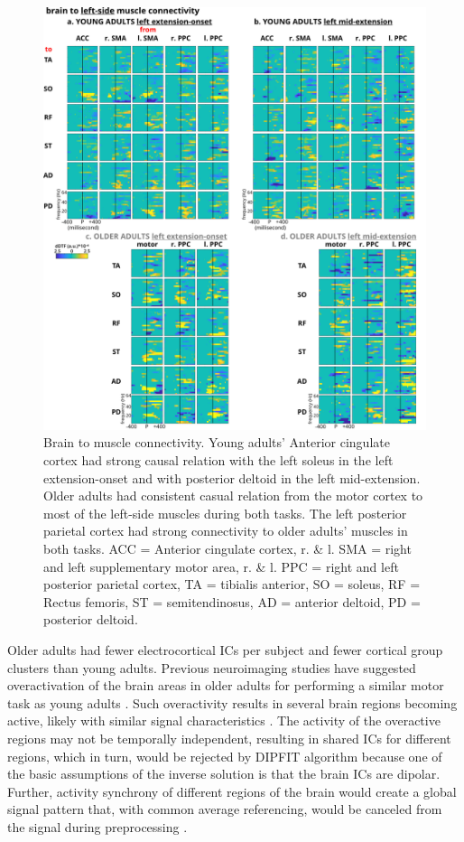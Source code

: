 \documentclass[../thesis_seyed.tex]{subfiles}
\begin{document}
\begin{figure}[H]

    \centering
    \includegraphics[scale=0.85]{../img/figure 5 - B2M connectivity.jpg}
    \caption{Brain to muscle connectivity. Young adults’ Anterior cingulate cortex had strong causal relation with the left soleus in the left extension-onset and with posterior deltoid in the left mid-extension. Older adults had consistent casual relation from the motor cortex to most of the left-side muscles during both tasks. The left posterior parietal cortex had strong connectivity to older adults’ muscles in both tasks. ACC = Anterior cingulate cortex, r. \& l. SMA = right and left supplementary motor area, r. \& l. PPC = right and left posterior parietal cortex, TA = tibialis anterior, SO = soleus, RF = Rectus femoris, ST = semitendinosus, AD = anterior deltoid, PD = posterior deltoid.}
    \label{fig:b2m}
\end{figure}

Older adults had fewer electrocortical ICs per subject and fewer cortical group clusters than young adults. Previous neuroimaging studies have suggested overactivation of the brain areas in older adults for performing a similar motor task as young adults \cite{Reuter-Lorenz2008-bn}. Such overactivity results in several brain regions becoming active, likely with similar signal characteristics \cite{Seidler2010-yv}. The activity of the overactive regions may not be temporally independent, resulting in shared ICs for different regions, which in turn, would be rejected by DIPFIT algorithm because one of the basic assumptions of the inverse solution is that the brain ICs are dipolar. Further, activity synchrony of different regions of the brain would create a global signal pattern that, with common average referencing, would be canceled from the signal during preprocessing \cite{Roeder2020-tv,Chella2016-zf}.
\end{document}
